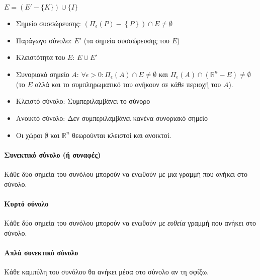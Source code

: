 \documentclass[11pt,a4paper,titlepage,draft]{article}
\begin{document}
\( E = (E' - \lbrace K\rbrace ) \cup \lbrace I\rbrace \)



\begin{itemize}
\item Σημείο συσσώρευσης: \( \left( \Pi_\epsilon(P) - \left\lbrace P \right\rbrace \right) \cap E \neq \emptyset \)
\item Παράγωγο σύνολο: \(Ε'\) (τα σημεία συσσώρευσης του \(Ε\))
\item Κλειστότητα του \(Ε\): \(Ε \cup E'\)
\item Συνοριακό σημείο \(Α\): \(\forall \epsilon > 0: \Pi_\epsilon(A) \cap E \neq \emptyset\) και \(\Pi_\epsilon(A) \cap \left( \mathbb R^n - E \right) \neq \emptyset\) (το \(Ε\) αλλά και το συμπληρωματικό του ανήκουν σε κάθε περιοχή του \(Α\)).
\item Κλειστό σύνολο: Συμπεριλαμβάνει το σύνορο
\item Ανοικτό σύνολο: Δεν συμπεριλαμβάνει κανένα συνοριακό σημείο
\item Οι χώροι \(\emptyset\) και \( \mathbb R ^ n \) θεωρούνται κλειστοί και ανοικτοί.
\end{itemize}

\paragraph{Συνεκτικό σύνολο (ή συναφές)}
Κάθε δύο σημεία του συνόλου μπορούν να ενωθούν με μια γραμμή που ανήκει στο σύνολο.

\paragraph{Κυρτό σύνολο}
Κάθε δύο σημεία του συνόλου μπορούν να ενωθούν με \textit{ευθεία} γραμμή που ανήκει στο σύνολο.

\paragraph{Απλά συνεκτικό σύνολο}
Κάθε καμπύλη του συνόλου θα ανήκει μέσα στο σύνολο αν τη σφίξω.
\end{document}

